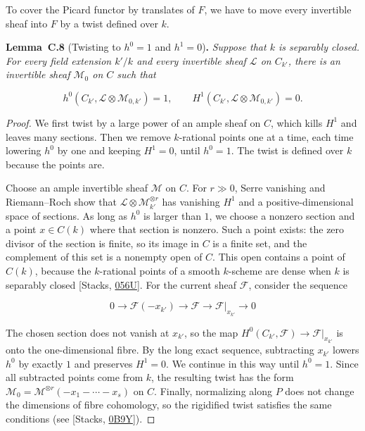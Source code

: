 \documentclass[11pt]{article}
\newenvironment{bpstatement}[2]{\par\addvspace{0.6\baselineskip}\noindent\textbf{#1}#2\textbf{.}\enspace\ignorespaces}
  {\par\addvspace{0.4\baselineskip}}
\newenvironment{bpstatementit}[2]{\begin{bpstatement}{#1}{#2}\itshape\ignorespaces}{\end{bpstatement}}
\begin{document}
\label{bp144}%
To cover the Picard functor by translates of \(F\), we have to move every invertible sheaf into \(F\) by a twist defined over \(k\).

\label{bp145}%
\begin{bpstatementit}{Lemma~C.8}{ (Twisting to $h^0=1$ and $h^1=0$)}
Suppose that \(k\) is separably closed. For every field extension \(k'/k\) and every invertible sheaf \(\mathcal L\) on \(C_{k'}\), there is an invertible sheaf \(\mathcal M_0\) on \(C\) such that

\[
h^0(C_{k'},\mathcal L\otimes\mathcal M_{0,k'})=1,
\qquad H^1(C_{k'},\mathcal L\otimes\mathcal M_{0,k'})=0.
\]
\end{bpstatementit}

\begin{proof}[{Proof}]\label{bp146}%
We first twist by a large power of an ample sheaf on \(C\), which kills \(H^1\) and leaves many sections. Then we remove \(k\)-rational points one at a time, each time lowering \(h^0\) by one and keeping \(H^1=0\), until \(h^0=1\). The twist is defined over \(k\) because the points are.

Choose an ample invertible sheaf \(\mathcal M\) on \(C\). For \(r\gg0\), Serre vanishing and Riemann–Roch show that \(\mathcal L\otimes\mathcal M_{k'}^{\otimes r}\) has vanishing \(H^1\) and a positive-dimensional space of sections. As long as \(h^0\) is larger than \(1\), we choose a nonzero section and a point \(x\in C(k)\) where that section is nonzero. Such a point exists: the zero divisor of the section is finite, so its image in \(C\) is a finite set, and the complement of this set is a nonempty open of \(C\). This open contains a point of \(C(k)\), because the \(k\)-rational points of a smooth \(k\)-scheme are dense when \(k\) is separably closed [Stacks, \href{https://stacks.math.columbia.edu/tag/056U}{056U}]. For the current sheaf \(\mathcal F\), consider the sequence

\[
0\longrightarrow\mathcal F(-x_{k'})
\longrightarrow\mathcal F
\longrightarrow\mathcal F|_{x_{k'}}\longrightarrow0
\]

The chosen section does not vanish at \(x_{k'}\), so the map \(H^0(C_{k'},\mathcal F)\to\mathcal F|_{x_{k'}}\) is onto the one-dimensional fibre. By the long exact sequence, subtracting \(x_{k'}\) lowers \(h^0\) by exactly \(1\) and preserves \(H^1=0\). We continue in this way until \(h^0=1\). Since all subtracted points come from \(k\), the resulting twist has the form \(\mathcal M_0=\mathcal M^{\otimes r}(-x_1-\cdots-x_s)\) on \(C\). Finally, normalizing along \(P\) does not change the dimensions of fibre cohomology, so the rigidified twist satisfies the same conditions (see [Stacks, \href{https://stacks.math.columbia.edu/tag/0B9Y}{0B9Y}]).
\end{proof}
\end{document}
